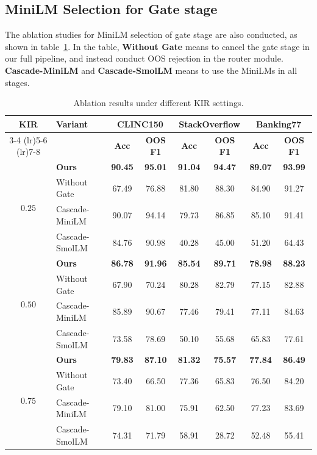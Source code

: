 \documentclass[11pt]{article}
\begin{document}
\subsection{MiniLM Selection for Gate stage}

The ablation studies for MiniLM selection of gate stage are also conducted, as shown in table~\ref{tab:ablation_all_kir}. In the table, \textbf{Without Gate} means to cancel the gate stage in our full pipeline, and instead conduct OOS rejection in the router module. \textbf{Cascade-MiniLM} and \textbf{Cascade-SmolLM} means to use the MiniLMs in all stages. 

\begin{table}[t]
  \centering
  \small
  \setlength{\tabcolsep}{0pt}
  \renewcommand{\arraystretch}{1.}
  \begin{tabular*}{\textwidth}{@{\extracolsep{\fill}}clcccccc@{}}
  \toprule
  \multirow{2}{*}{\textbf{KIR}}
  & \multirow{2}{*}{\textbf{Variant}}
  & \multicolumn{2}{c}{\textbf{CLINC150}}
  & \multicolumn{2}{c}{\textbf{StackOverflow}}
  & \multicolumn{2}{c}{\textbf{Banking77}} \\
  \cmidrule(lr){3-4}
  \cmidrule(lr){5-6}
  \cmidrule(lr){7-8}
  & & \textbf{Acc} & \textbf{OOS F1}
  & \textbf{Acc} & \textbf{OOS F1}
  & \textbf{Acc} & \textbf{OOS F1} \\
  \midrule
  \multirow{4}{*}{$0.25$}
  & \textbf{Ours}  & \textbf{90.45} & \textbf{95.01} & \textbf{91.04} & \textbf{94.47} & \textbf{89.07} & \textbf{93.99} \\
  & Without Gate   & 67.49 & 76.88 & 81.80 & 88.30 & 84.90 & 91.27 \\
  & Cascade-MiniLM & 90.07 & 94.14 & 79.73 & 86.85 & 85.10 & 91.41 \\
  & Cascade-SmolLM & 84.76 & 90.98 & 40.28 & 45.00 & 51.20 & 64.43 \\
  \midrule
  \multirow{4}{*}{$0.50$}
  & \textbf{Ours}  & \textbf{86.78} & \textbf{91.96} & \textbf{85.54} & \textbf{89.71} & \textbf{78.98} & \textbf{88.23} \\
  & Without Gate   & 67.90 & 70.24 & 80.28 & 82.79 & 77.15 & 82.88 \\
  & Cascade-MiniLM & 85.89 & 90.67 & 77.46 & 79.41 & 77.11 & 84.63 \\
  & Cascade-SmolLM & 73.58 & 78.69 & 50.10 & 55.68 & 65.83 & 77.61 \\
  \midrule
  \multirow{4}{*}{$0.75$}
  & \textbf{Ours}  & \textbf{79.83} & \textbf{87.10} & \textbf{81.32} & \textbf{75.57} & \textbf{77.84} & \textbf{86.49} \\
  & Without Gate   & 73.40 & 66.50 & 77.36 & 65.83 & 76.50 & 84.20 \\
  & Cascade-MiniLM & 79.10 & 81.00 & 75.91 & 62.50 & 77.23 & 83.69 \\
  & Cascade-SmolLM & 74.31 & 71.79 & 58.91 & 28.72 & 52.48 & 55.41 \\
  \bottomrule
  \end{tabular*}
  \caption{Ablation results under different KIR settings.}
  \label{tab:ablation_all_kir}
\end{table}
\end{document}
